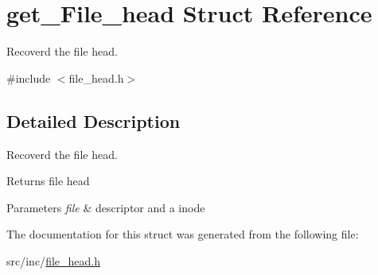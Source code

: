 \hypertarget{structget___file__head}{}\section{get\+\_\+\+File\+\_\+head Struct Reference}
\label{structget___file__head}


Recoverd the file head.  




{\ttfamily \#include $<$file\+\_\+head.\+h$>$}



\subsection{Detailed Description}
Recoverd the file head. 

\begin{DoxyReturn}{Returns}
file head 
\end{DoxyReturn}

\begin{DoxyParams}{Parameters}
{\em file} & descriptor and a inode \\
\hline
\end{DoxyParams}


The documentation for this struct was generated from the following file\+:\begin{DoxyCompactItemize}
\item 
src/inc/\mbox{\hyperlink{file__head_8h}{file\+\_\+head.\+h}}\end{DoxyCompactItemize}

